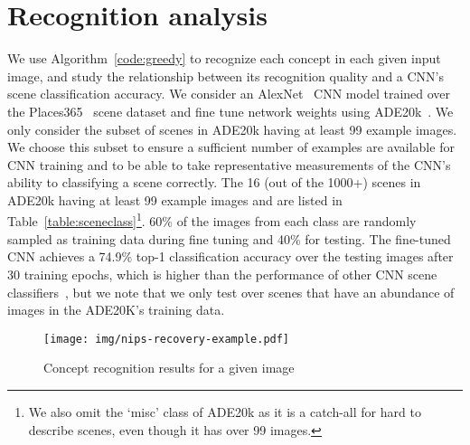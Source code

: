 \documentclass{article}
\begin{document}
\section{Recognition analysis}
\label{sec:recognition_analysis}
We use Algorithm~\ref{code:greedy} to recognize each concept in each given input image,
and study the relationship between its recognition quality
and a CNN's scene classification accuracy. We consider an 
AlexNet~\citep{krizhevsky2012imagenet} CNN model
trained over the Places365~\citep{zhou2016places} scene dataset and fine tune network weights using 
ADE20k~\citep{zhou2017scene}. We only consider the subset of scenes in ADE20k having at least
99 example images.
We choose this subset to ensure a sufficient number of examples are available for CNN training and 
to be able to take representative measurements of the CNN's ability to classifying a scene correctly. 
The 16 (out of the 1000+) 
scenes in ADE20k having at least 99 example images and are listed in Table~\ref{table:sceneclass}\footnote{We also omit the `misc' class of ADE20k as it is a catch-all for hard to describe scenes, even though it has over 99 images.}. 60\% of the images from each class are randomly sampled as training data during fine tuning and
40\% for testing. The fine-tuned CNN achieves a 74.9\% top-1 classification accuracy
over the testing images after 30 training epochs, which is higher than the performance of other 
CNN scene classifiers~\citep{zhou2016places}, but we note that we only test over scenes that
have an abundance of images in the ADE20K's training data. 

\begin{figure}[h]
  \centering
  \texttt{[image: img/nips-recovery-example.pdf]}
  \caption{Concept recognition results for a given image}
  \label{fig:nips-recovery-example}
\end{figure}
\end{document}
